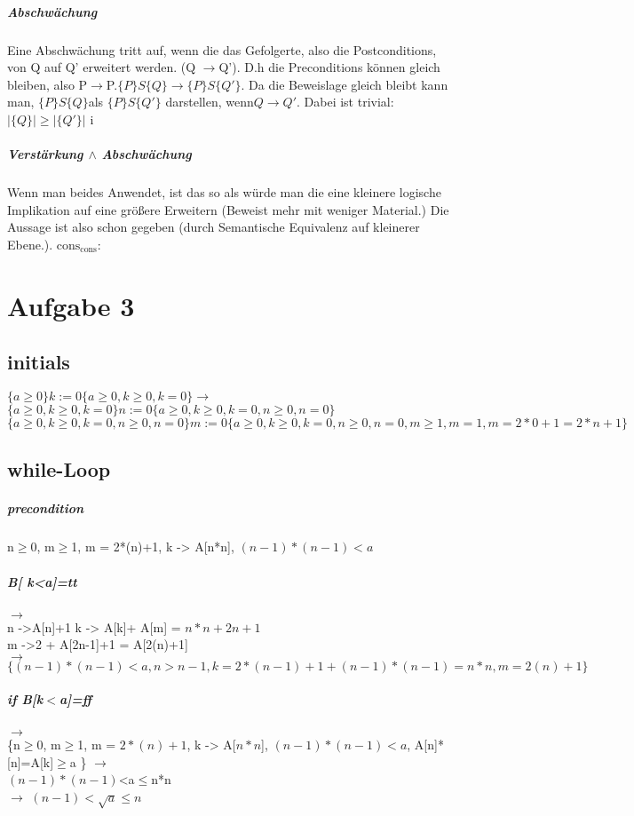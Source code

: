\documentclass[10pt,a4paper]{article}
\begin{document}
 \subparagraph{Abschwächung} 
  Eine Abschwächung tritt auf, wenn die das Gefolgerte, also die Postconditions, von Q auf Q' erweitert werden. (Q $\rightarrow$Q'). D.h die  Preconditions können gleich bleiben, also P$\rightarrow$P.$\{P\} S  \{Q\} \rightarrow \{P\} S \{Q'\} $. Da die Beweislage gleich bleibt kann man, $\{P\} S  \{Q\} $als $ \{P\} S \{Q'\} $ darstellen, wenn$Q \rightarrow Q' $. Dabei ist trivial: $|\{Q\}|\geq|\{Q'\}|$
i\subparagraph{Verstärkung $\wedge$ Abschwächung}
Wenn man beides Anwendet, ist das so als würde man die eine kleinere  logische Implikation auf eine größere Erweitern (Beweist mehr mit weniger Material.) Die Aussage ist  also schon gegeben (durch Semantische Equivalenz auf kleinerer Ebene.).
$\text{cons}_\text{cons}$:

\pagebreak
\section{Aufgabe 3} 

\subsection{initials}
$ \{a \ge 0 \} k:= 0 \{a \ge 0, k \ge 0, k = 0 \} \rightarrow$ \newline 
$ \{a \ge 0, k \ge 0, k =0 \} n:=0 \{a \ge 0, k \ge 0, k =0 , n\ge 0 , n = 0\}$ \newline
 $\{a \ge 0, k \ge 0, k =0 , n\ge 0 , n = 0\} m := 0 \{a \ge 0, k \ge 0, k =0 , n\ge 0 , n = 0, m \ge 1, m = 1 , m = 2 * 0 +1 = 2 * n +1 \}$
 \newline
 
\subsection{while-Loop}
\subparagraph{precondition}
{n$\ge$0, m$\ge$1, m = 2*(n)+1, k -> A[n*n], $(n-1)*(n-1)<a$ }

 \subparagraph{B[ k<a]=tt} $\rightarrow$
 \\
   n ->A[n]+1
   k -> A[k]+ A[m] = $n*n+  2n+1$ \\
   m ->2 + A[2n-1]+1 = A[2(n)+1]\\
$\rightarrow$
$\{(n-1)*(n-1)<a, n>n-1, k=2*(n-1)+1+(n-1)*(n-1) = n*n, m= 2(n)+1 \}$

\subparagraph{if B[k$<$a]=ff}
$\rightarrow $ \\
\{n$\ge$0, m$\ge$1, m = $2*(n)+1$, k -> A[$n*n$], $(n-1)*(n-1)<a$, A[n]*[n]=A[k]$\ge$a \}
$\rightarrow$  \\$(n-1)*(n-1)$<a$\le$n*n \\ $\rightarrow$ $(n-1)<\sqrt{a}\le n$
	
	
\end{document}
